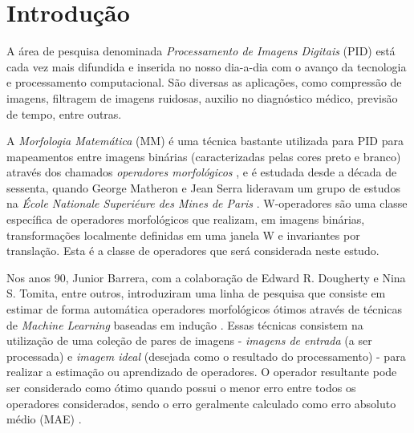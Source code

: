 

\chapter{Introdução}
\label{cap:introducao}

\enlargethispage{.5\baselineskip}

A área de pesquisa denominada \emph{Processamento de Imagens Digitais} (PID) está cada vez mais difundida e inserida no nosso dia-a-dia com o avanço da tecnologia e processamento computacional. São diversas as aplicações, como compressão de imagens, filtragem de imagens ruidosas, auxilio no diagnóstico médico, previsão de tempo, entre outras.

A \emph{Morfologia Matemática} (MM) é uma técnica bastante utilizada para PID para mapeamentos entre imagens binárias (caracterizadas pelas cores preto e branco) através dos chamados \emph{operadores morfológicos} \cite{NINA:02}, e é estudada desde a década de sessenta, quando George Matheron e Jean Serra lideravam um grupo de estudos na \textit{École Nationale Superiéure des Mines de Paris} \cite{NINA:01}. W-operadores são uma classe específica de operadores morfológicos que realizam, em imagens binárias, transformações localmente definidas em uma janela W e invariantes por translação. Esta é a classe de operadores que será considerada neste estudo.

Nos anos 90, Junior Barrera, com a colaboração de  Edward R. Dougherty e Nina S. Tomita, entre outros, introduziram uma linha de pesquisa que consiste em estimar de forma automática operadores morfológicos ótimos através de técnicas de \textit{Machine Learning} baseadas em indução \cite{BARRERA:01}. Essas técnicas consistem na utilização de uma coleção de pares de imagens - \textit{imagens de entrada} (a ser processada) e \textit{imagem ideal} (desejada como o resultado do processamento) - para realizar a estimação ou aprendizado de operadores. O operador resultante pode ser considerado como ótimo quando possui o menor erro entre todos os operadores considerados, sendo o erro geralmente calculado como erro absoluto médio (MAE) \cite{NINA:02}.

